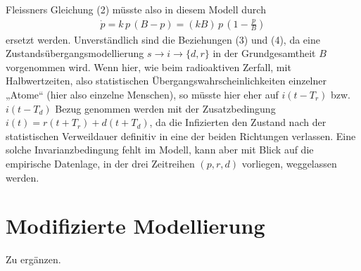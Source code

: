 \documentclass[a4paper,11pt]{article}
\begin{document}
Fleissners Gleichung (2) müsste also in diesem Modell durch
\begin{gather*}
  \dot{p}=k\,p\,(B-p)=(kB)\,p\,\left(1-\frac{p}{B}\right)\tag{2a}
\end{gather*}
ersetzt werden. Unverständlich sind die Beziehungen (3) und (4), da eine
Zustandsübergangsmodellierung $s\to i\to \{d,r\}$ in der Grundgesamtheit $B$
vorgenommen wird. Wenn hier, wie beim radioaktiven Zerfall, mit
Halbwertzeiten, also statistischen Übergangswahrscheinlichkeiten einzelner
„Atome“ (hier also einzelne Menschen), so müsste hier eher auf $i(t-T_r)$ bzw.
$i(t-T_d)$ Bezug genommen werden mit der Zusatzbedingung
$i(t)=r(t+T_r)+d(t+T_d)$, da die Infizierten den Zustand nach der
statistischen Verweildauer definitiv in eine der beiden Richtungen verlassen.
Eine solche Invarianzbedingung fehlt im Modell, kann aber mit Blick auf die
empirische Datenlage, in der drei Zeitreihen $(p,r,d)$ vorliegen, weggelassen
werden.  

\section{Modifizierte Modellierung}

Zu ergänzen.
\end{document}
